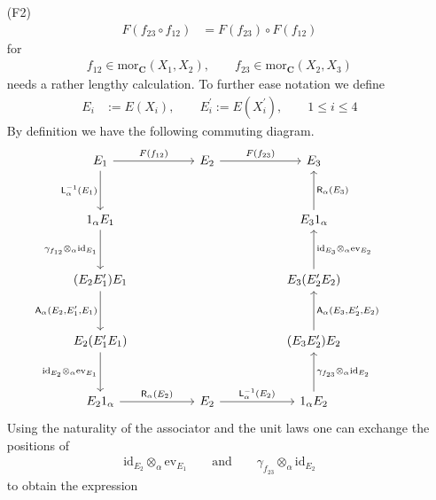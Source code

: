\begin{prf}[Sketch]
\begin{enumerate}
\item[(F2)]
\begin{align*}
  F(f_{23} \circ f_{12})
  &=
  F(f_{23}) \circ F(f_{12})
\end{align*}
for
\begin{align*}
  f_{12} \in \mathrm{mor}_{\mathbf{C}}(X_{1},X_{2})
  ,\qquad
  f_{23} \in \mathrm{mor}_{\mathbf{C}}(X_{2},X_{3})
\end{align*}
needs a rather lengthy calculation. To further ease notation we define
\begin{align*}
  E_{i}
  &:=
  E(X_{i})
  ,\qquad
  E_{i}^{\prime}
  :=
  E(X_{i}^{\prime})
  ,\qquad
  1
  \leq
  i
  \leq
  4
\end{align*}
By definition we have the following commuting diagram.
\begin{equation*}
\hspace{-2em}
\begin{tikzcd}[row sep=3.2em,column sep=5em]
  E_{1}
  \ar{r}{F(f_{12})}
  \ar{d}[swap]{\mathsf{L}_{\alpha}^{-1}(E_{1})}
  &
  E_{2}
  \ar{r}{F(f_{23})}
  &
  E_{3}
  \\
  1_{\alpha} E_{1}
  \ar{d}[swap]{\gamma_{f_{12}} \otimes_{\alpha} \mathrm{id}_{E_{1}}}
  &
  &
  E_{3} 1_{\alpha}
  \ar{u}[swap]{\mathsf{R}_{\alpha}(E_{3})}
  \\
  (E_{2} E_{1}^{\prime}) E_{1}
  \ar{d}[swap]{\mathsf{A}_{\alpha}(E_{2},E_{1}^{\prime},E_{1})}
  &
  &
  E_{3} (E_{2}^{\prime} E_{2})
  \ar{u}[swap]{\mathrm{id}_{E_{3}} \otimes_{\alpha} \mathrm{ev}_{E_{2}}}
  \\
  E_{2} (E_{1}^{\prime} E_{1})
  \ar{d}[swap]{\mathrm{id}_{E_{2}} \otimes_{\alpha} \mathrm{ev}_{E_{1}}}
  &
  &
  (E_{3} E_{2}^{\prime}) E_{2}
  \ar{u}[swap]{\mathsf{A}_{\alpha}(E_{3},E_{2}^{\prime},E_{2})}
  \\
  E_{2} 1_{\alpha}
  \ar{r}{\mathsf{R}_{\alpha}(E_{2})}
  &
  E_{2}
  \ar{r}{\mathsf{L}_{\alpha}^{-1}(E_{2})}
  &
  1_{\alpha} E_{2}
  \ar{u}[swap]{\gamma_{f_{23}} \otimes_{\alpha} \mathrm{id}_{E_{2}}}
\end{tikzcd}
\end{equation*}
Using the naturality of the associator and the unit laws one can exchange the positions of
\begin{align*}
  \mathrm{id}_{E_{2}}
  \otimes_{\alpha}
  \mathrm{ev}_{E_{1}}
  \qquad
  \text{and}
  \qquad
  \gamma_{f_{23}}
  \otimes_{\alpha}
  \mathrm{id}_{E_{2}}
\end{align*}
to obtain the expression
\begin{align*}

\end{align*}
\end{enumerate}
\end{prf}
